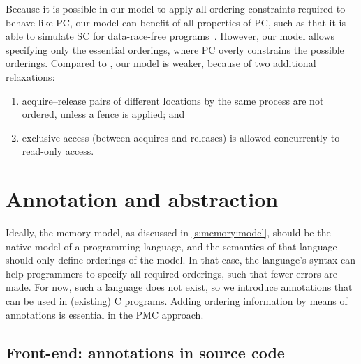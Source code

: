 Because it is possible in our model to apply all ordering constraints required to behave like \ac{PC}, our model can benefit of all properties of \ac{PC}, such as that it is able to simulate \ac{SC} for data-race-free programs~\cite{gharachorloo:release_consistency,ahamad:processor_consistency}.
However, our model allows specifying only the essential orderings, where \ac{PC} overly constrains the possible orderings.
Compared to , our model is weaker, because of two additional relaxations:
\begin{enumerate}
\item acquire--release pairs of different locations by the same process are not ordered, unless a fence is applied; and
\item exclusive access (between acquires and releases) is allowed concurrently to read-only access.
\end{enumerate}


\section{Annotation and abstraction}
\label{s:memory:abstraction}


Ideally, the  memory model, as discussed in \cref{s:memory:model}, should be the native model of a programming language, and the semantics of that language should only define orderings of the model.
In that case, the language's syntax can help programmers to specify all required orderings, such that fewer errors are made.
For now, such a language does not exist, so we introduce annotations that can be used in (existing) C programs.
Adding ordering information by means of annotations is essential in the \ac{PMC} approach.

\subsection{Front-end: annotations in source code}
\label{s:memory:annotations}

